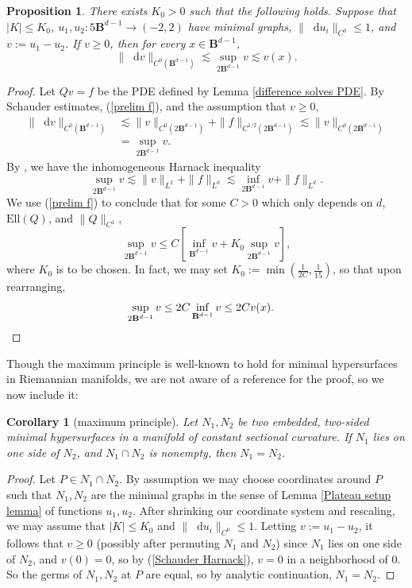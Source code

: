 \documentclass[reqno,11pt]{amsart}
\newcommand{\Ball}{\mathbf{B}}
\newcommand*\dif{\mathop{}\!\mathrm{d}}
\newcommand{\Ell}{\mathrm{Ell}}
\newtheorem{proposition}[theorem]{Proposition}
\newtheorem{corollary}[theorem]{Corollary}
\theoremstyle{definition}
\numberwithin{equation}{section}
\begin{document}
\begin{proposition}
There exists $K_0 > 0$ such that the following holds.
Suppose that $|K| \leq K_0$, $u_1, u_2: 5\Ball^{d - 1} \to (-2, 2)$ have minimal graphs, $\|\dif u_i\|_{C^0} \leq 1$, and $v := u_1 - u_2$.
If $v \geq 0$, then for every $x \in \Ball^{d - 1}$,
\begin{equation}\label{Schauder Harnack}
	\|\dif v\|_{C^0(\Ball^{d - 1})} \lesssim \sup_{2\Ball^{d - 1}} v \lesssim v(x).
\end{equation}
\end{proposition}
\begin{proof}
Let $Qv = f$ be the PDE defined by Lemma \ref{difference solves PDE}.
By Schauder estimates, (\ref{prelim f}), and the assumption that $v \geq 0$,
\begin{align*}
\|\dif v\|_{C^0(\Ball^{d - 1})}
&\lesssim \|v\|_{C^0(2\Ball^{d - 1})} + \|f\|_{C^{1/2}(2\Ball^{d - 1})} \lesssim \|v\|_{C^0(2\Ball^{d - 1})} \\
&= \sup_{2\Ball^{d - 1}} v.
\end{align*}
By \cite[Theorems 9.20 and 9.22]{gilbarg2015elliptic}, we have the inhomogeneous Harnack inequality 
$$\sup_{2\Ball^{d - 1}} v \lesssim \|v\|_{L^2} + \|f\|_{L^d} \lesssim \inf_{2\Ball^{d - 1}} v + \|f\|_{L^d}.$$
We use (\ref{prelim f}) to conclude that for some $C > 0$ which only depends on $d$, $\Ell(Q)$, and $\|Q\|_{C^1}$, 
$$\sup_{2\Ball^{d - 1}} v \leq C\left[\inf_{\Ball^{d - 1}} v + K_0 \sup_{2\Ball^{d - 1}} v\right],$$
where $K_0$ is to be chosen. In fact, we may set $K_0 := \min(\frac{1}{2C}, \frac{1}{15})$, so that upon rearranging, 
\begin{align*}
\sup_{2\Ball^{d - 1}} v &\leq 2C \inf_{\Ball^{d - 1}} v \leq 2Cv(x). \qedhere 
\end{align*}
\end{proof}

Though the maximum principle is well-known to hold for minimal hypersurfaces in Riemannian manifolds, we are not aware of a reference for the proof, so we now include it:

\begin{corollary}[maximum principle]
Let $N_1, N_2$ be two embedded, two-sided minimal hypersurfaces in a manifold of constant sectional curvature.
If $N_1$ lies on one side of $N_2$, and $N_1 \cap N_2$ is nonempty, then $N_1 = N_2$.
\end{corollary}
\begin{proof}
Let $P \in N_1 \cap N_2$.
By assumption we may choose coordinates around $P$ such that $N_1, N_2$ are the minimal graphs in the sense of Lemma \ref{Plateau setup lemma} of functions $u_1, u_2$.
After shrinking our coordinate system and rescaling, we may assume that $|K| \leq K_0$ and $\|\dif u_i\|_{C^0} \leq 1$.
Letting $v := u_1 - u_2$, it follows that $v \geq 0$ (possibly after permuting $N_1$ and $N_2$) since $N_1$ lies on one side of $N_2$, and $v(0) = 0$, so by (\ref{Schauder Harnack}), $v = 0$ in a neighborhood of $0$.
So the germs of $N_1, N_2$ at $P$ are equal, so by analytic continuation, $N_1 = N_2$.
\end{proof}
\end{document}
